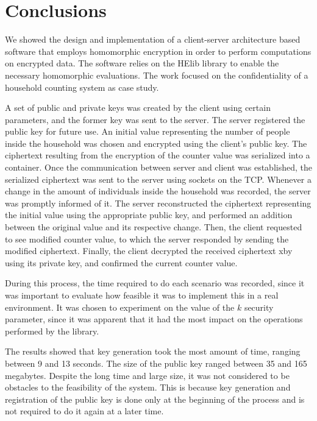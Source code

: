 \chapter{Conclusions}
\label{conclusions}

We showed the design and implementation of a client-server architecture based software that employs homomorphic encryption in order to perform computations on encrypted data. The software relies on the HElib library to enable the necessary homomorphic evaluations. The work focused on the confidentiality of a household counting system as case study. 

A set of public and private keys was created by the client using certain parameters, and the former key was sent to the server. The server registered the public key for future use. An initial value representing the number of people inside the household was chosen and encrypted using the client's public key. The ciphertext resulting from the encryption of the counter value was serialized into a container. Once the communication between server and client was established, the serialized ciphertext was sent to the server using sockets on the TCP. Whenever a change in the amount of individuals inside the household was recorded, the server was promptly informed of it. The server reconstructed the ciphertext representing the initial value using the appropriate public key, and performed an addition between the original value and its respective change. Then, the client requested to see modified counter value, to which the server responded by sending the modified ciphertext. Finally, the client decrypted the received ciphertext xby using its private key, and confirmed the current counter value. 

During this process, the time required to do each scenario was recorded, since it was important to evaluate how feasible it was to implement this in a real environment. It was chosen to experiment on the value of the $k$ security parameter, since it was apparent that it had the most impact on the operations performed by the library. 

The results showed that key generation took the most amount of time, ranging between 9 and 13 seconds. The size of the public key ranged between 35 and 165 megabytes. Despite the long time and large size, it was not considered to be obstacles to the feasibility of the system. This is because key generation and registration of the public key is done only at the beginning of the process and is not required to do it again at a later time.  

